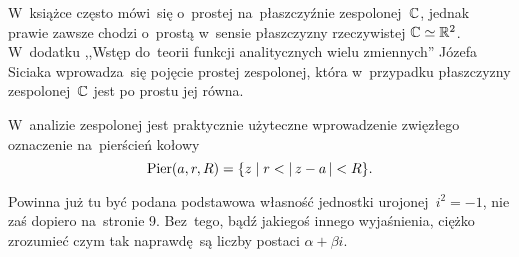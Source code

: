 \documentclass[a4paper,11pt]{article}
\begin{document}
\vspace{\spaceTwo}





\start W~książce często mówi~się o~prostej na~płaszczyźnie
zespolonej~$\mathbb{C}$, jednak prawie zawsze chodzi o~prostą w~sensie
płaszczyzny rzeczywistej $\mathbb{C} \simeq \mathbb{R}^{ 2 }$. W~dodatku ,,Wstęp
do~teorii funkcji analitycznych wielu zmiennych'' Józefa Siciaka
wprowadza~się pojęcie prostej zespolonej, która w~przypadku
płaszczyzny zespolonej~$\mathbb{C}$ jest po prostu jej równa.

\vspace{\spaceFour}


\start W~analizie zespolonej jest praktycznie użyteczne wprowadzenie
zwięzłego oznaczenie na~pierścień kołowy
\begin{equation}
  \label{eq:Leja-01}
  \textrm{Pier}(a, r, R) = \{ z \;|\; r < \left| \,  z - a  \, \right| < R \}.
\end{equation}

\vspace{\spaceFour}


\start {} Powinna już tu być podana podstawowa własność jednostki
urojonej~$i^{ 2 } = -1$, nie zaś dopiero na~stronie 9. Bez~tego, bądź
jakiegoś innego wyjaśnienia, ciężko zrozumieć czym tak naprawdę~są
liczby postaci $\alpha + \beta i$.

\vspace{\spaceFour}
\end{document}
